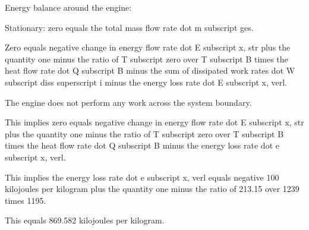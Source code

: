 Energy balance around the engine:

Stationary: zero equals the total mass flow rate dot m subscript ges.

Zero equals negative change in energy flow rate dot E subscript x, str plus the quantity one minus the ratio of T subscript zero over T subscript B times the heat flow rate dot Q subscript B minus the sum of dissipated work rates dot W subscript diss superscript i minus the energy loss rate dot E subscript x, verl.

The engine does not perform any work across the system boundary.

This implies zero equals negative change in energy flow rate dot E subscript x, str plus the quantity one minus the ratio of T subscript zero over T subscript B times the heat flow rate dot Q subscript B minus the energy loss rate dot e subscript x, verl.

This implies the energy loss rate dot e subscript x, verl equals negative 100 kilojoules per kilogram plus the quantity one minus the ratio of 213.15 over 1239 times 1195.

This equals 869.582 kilojoules per kilogram.